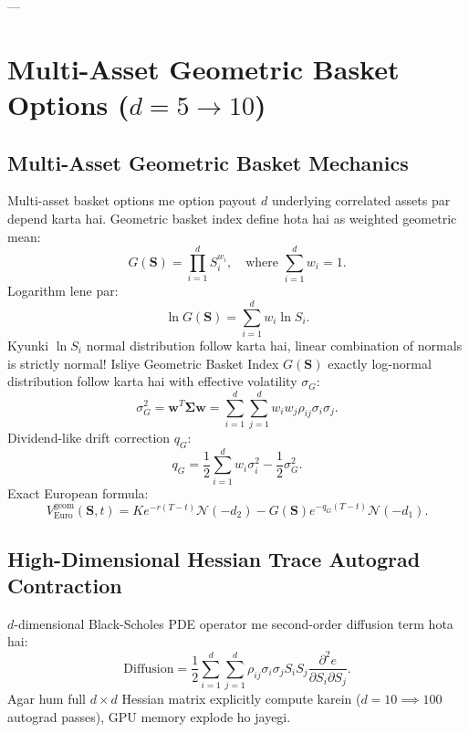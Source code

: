 \documentclass[11pt,a4paper,oneside]{book}
\begin{document}
---

\chapter{Multi-Asset Geometric Basket Options ($d=5 \to 10$)}

\section{Multi-Asset Geometric Basket Mechanics}
Multi-asset basket options me option payout $d$ underlying correlated assets par depend karta hai.
Geometric basket index define hota hai as weighted geometric mean:
\begin{equation}
    G(\mathbf{S}) = \prod_{i=1}^d S_i^{w_i}, \quad \text{where } \sum_{i=1}^d w_i = 1.
\end{equation}
Logarithm lene par:
\begin{equation}
    \ln G(\mathbf{S}) = \sum_{i=1}^d w_i \ln S_i.
\end{equation}
Kyunki $\ln S_i$ normal distribution follow karta hai, linear combination of normals is strictly normal! Isliye Geometric Basket Index $G(\mathbf{S})$ exactly log-normal distribution follow karta hai with effective volatility $\sigma_G$:
\begin{equation}
    \sigma_G^2 = \mathbf{w}^T \mathbf{\Sigma} \mathbf{w} = \sum_{i=1}^d \sum_{j=1}^d w_i w_j \rho_{ij} \sigma_i \sigma_j.
\end{equation}
Dividend-like drift correction $q_G$:
\begin{equation}
    q_G = \frac{1}{2}\sum_{i=1}^d w_i \sigma_i^2 - \frac{1}{2}\sigma_G^2.
\end{equation}
Exact European formula:
\begin{equation}
    V_{\text{Euro}}^{\text{geom}}(\mathbf{S}, t) = K e^{-r(T-t)} \mathcal{N}(-d_2) - G(\mathbf{S}) e^{-q_G(T-t)} \mathcal{N}(-d_1).
\end{equation}

\section{High-Dimensional Hessian Trace Autograd Contraction}
$d$-dimensional Black-Scholes PDE operator me second-order diffusion term hota hai:
\begin{equation}
    \text{Diffusion} = \frac{1}{2}\sum_{i=1}^d \sum_{j=1}^d \rho_{ij} \sigma_i \sigma_j S_i S_j \frac{\partial^2 e}{\partial S_i \partial S_j}.
\end{equation}
Agar hum full $d \times d$ Hessian matrix explicitly compute karein ($d=10 \implies 100$ autograd passes), GPU memory explode ho jayegi.
\end{document}
